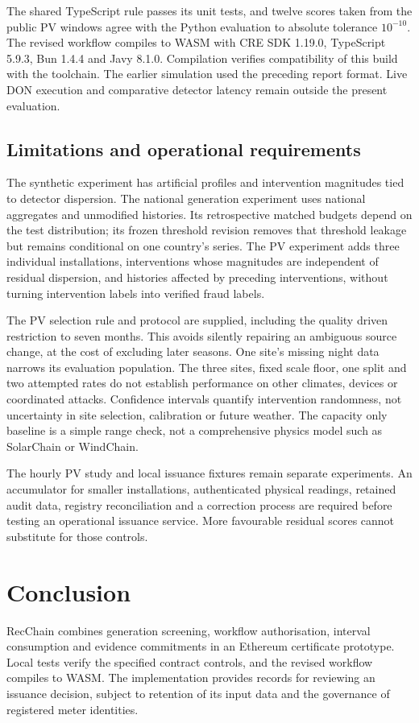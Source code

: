 \documentclass[11pt,a4paper]{article}
\begin{document}
The shared TypeScript rule passes its unit tests, and twelve scores taken from the public PV windows agree with the Python evaluation to absolute tolerance $10^{-10}$. The revised workflow compiles to WASM with CRE SDK 1.19.0, TypeScript 5.9.3, Bun 1.4.4 and Javy 8.1.0. Compilation verifies compatibility of this build with the toolchain. The earlier simulation used the preceding report format. Live DON execution and comparative detector latency remain outside the present evaluation.

\subsection{Limitations and operational requirements}
The synthetic experiment has artificial profiles and intervention magnitudes tied to detector dispersion. The national generation experiment uses national aggregates and unmodified histories. Its retrospective matched budgets depend on the test distribution; its frozen threshold revision removes that threshold leakage but remains conditional on one country's series. The PV experiment adds three individual installations, interventions whose magnitudes are independent of residual dispersion, and histories affected by preceding interventions, without turning intervention labels into verified fraud labels.

The PV selection rule and protocol are supplied, including the quality driven restriction to seven months. This avoids silently repairing an ambiguous source change, at the cost of excluding later seasons. One site's missing night data narrows its evaluation population. The three sites, fixed scale floor, one split and two attempted rates do not establish performance on other climates, devices or coordinated attacks. Confidence intervals quantify intervention randomness, not uncertainty in site selection, calibration or future weather. The capacity only baseline is a simple range check, not a comprehensive physics model such as SolarChain or WindChain.

The hourly PV study and local issuance fixtures remain separate experiments. An accumulator for smaller installations, authenticated physical readings, retained audit data, registry reconciliation and a correction process are required before testing an operational issuance service. More favourable residual scores cannot substitute for those controls.

\section{Conclusion}
RecChain combines generation screening, workflow authorisation, interval consumption and evidence commitments in an Ethereum certificate prototype. Local tests verify the specified contract controls, and the revised workflow compiles to WASM. The implementation provides records for reviewing an issuance decision, subject to retention of its input data and the governance of registered meter identities.
\end{document}
